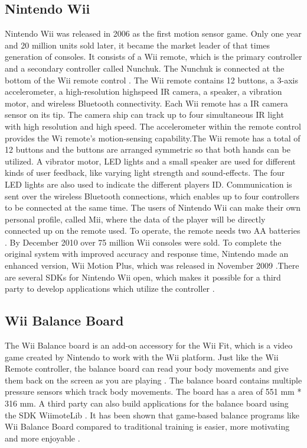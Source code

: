 \subsection{Nintendo Wii}
Nintendo Wii was released in 2006 as the first motion sensor game. Only one year and 20 million units sold later, it became the market leader of that times generation of consoles. It consists of a Wii remote, which is the primary controller and a secondary controller called Nunchuk. The Nunchuk is connected at the bottom of the Wii remote control \cite{hackingwii}. The Wii remote contains 12 buttons, a 3-axis accelerometer, a high-resolution highspeed IR camera, a speaker, a vibration motor, and wireless Bluetooth connectivity.
Each Wii remote has a IR camera sensor on its tip. The camera ship can track up to four simultaneous IR light with high resolution and high speed. The accelerometer within the remote control provides the Wi remote’s motion-sensing capability.The Wii remote has a total of 12 buttons and the buttons are arranged symmetric so that both hands can be utilized. A vibrator motor, LED lights and a small speaker are used for different kinds of user feedback, like varying light strength and sound-effects. The four LED lights are also used to indicate the different players ID. Communication is sent over the wireless Bluetooth connections, which enables up to four controllers to be connected at the same time.  The users of Nintendo Wii can make their own personal profile, called Mii, where the data of the player will be directly connected up on the remote used. To operate, the remote needs two AA batteries \cite{hackingwii} \cite{whatiswii}. By December 2010 over 75 million Wii consoles were sold.  To complete the original system with improved accuracy and response time, Nintendo made an enhanced version, Wii Motion Plus, which was released in November 2009 \cite{consoles}.There are several SDKs for Nintendo Wii open, which makes it possible for a third party to develop applications which utilize the controller \cite{comparison}. 

\subsection{Wii Balance Board}
The Wii Balance board is an add-on accessory for the Wii Fit, which is a video game created by Nintendo to work with the Wii platform. Just like the Wii Remote controller, the balance board can read your body movements and give them back on the screen as you are playing \cite{whatiswiifit}. The balance board contains multiple pressure sensors which track body movements. The board has a area of 551 mm {*} 316 mm. A third party can also build applications for the balance board using the SDK WiimoteLib \cite{comparison}. It has been shown that game-based balance programs like Wii Balance Board compared to traditional training is easier, more motivating and more enjoyable \cite{taylor2011activity}.

